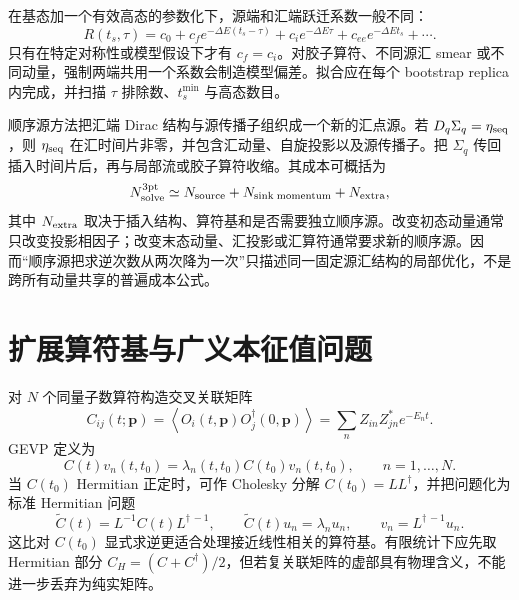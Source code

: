 在基态加一个有效高态的参数化下，源端和汇端跃迁系数一般不同：
\begin{equation}
  R(t_s,\tau)
  =c_0
  +c_f e^{-\Delta E(t_s-\tau)}
  +c_i e^{-\Delta E\tau}
  +c_{ee}e^{-\Delta E t_s}
  +\cdots .
  \label{eq:b02-two-state-general}
\end{equation}
只有在特定对称性或模型假设下才有 \(c_f=c_i\)。对胶子算符、不同源汇 smear 或不同动量，强制两端共用一个系数会制造模型偏差。拟合应在每个 bootstrap replica 内完成，并扫描 \(\tau\) 排除数、\(t_s^{\min}\) 与高态数目。

顺序源方法把汇端 Dirac 结构与源传播子组织成一个新的汇点源。若 \(D_q\Sigma_q=\eta_{\rm seq}\)，则 \(\eta_{\rm seq}\) 在汇时间片非零，并包含汇动量、自旋投影以及源传播子。把 \(\Sigma_q\) 传回插入时间片后，再与局部流或胶子算符收缩。其成本可概括为
\begin{equation}
  N_{\rm solve}^{3{\rm pt}}
  \simeq N_{\rm source}
  +N_{\rm sink\;momentum}
  +N_{\rm extra},
  \label{eq:b02-sequential-cost}
\end{equation}
其中 \(N_{\rm extra}\) 取决于插入结构、算符基和是否需要独立顺序源。改变初态动量通常只改变投影相因子；改变末态动量、汇投影或汇算符通常要求新的顺序源。因而“顺序源把求逆次数从两次降为一次”只描述同一固定源汇结构的局部优化，不是跨所有动量共享的普遍成本公式。

\section{扩展算符基与广义本征值问题}\label{subsec:b02-gevp}

对 \(N\) 个同量子数算符构造交叉关联矩阵
\begin{equation}
  C_{ij}(t;\mathbf p)
  =\left\langle O_i(t,\mathbf p)O_j^\dagger(0,\mathbf p)\right\rangle
  =\sum_n Z_{in}Z_{jn}^*e^{-E_nt}.
  \label{eq:b02-correlation-matrix}
\end{equation}
GEVP 定义为
\begin{equation}
  C(t)v_n(t,t_0)
  =\lambda_n(t,t_0)C(t_0)v_n(t,t_0),
  \qquad n=1,\dots,N.
  \label{eq:b02-gevp}
\end{equation}
当 \(C(t_0)\) Hermitian 正定时，可作 Cholesky 分解 \(C(t_0)=LL^\dagger\)，并把问题化为标准 Hermitian 问题
\begin{equation}
  \widetilde C(t)
  =L^{-1}C(t)L^{\dagger\,-1},
  \qquad
  \widetilde C(t)u_n=\lambda_nu_n,
  \qquad
  v_n=L^{\dagger\,-1}u_n.
  \label{eq:b02-cholesky}
\end{equation}
这比对 \(C(t_0)\) 显式求逆更适合处理接近线性相关的算符基。有限统计下应先取 Hermitian 部分 \(C_H=(C+C^\dagger)/2\)，但若复关联矩阵的虚部具有物理含义，不能进一步丢弃为纯实矩阵。

